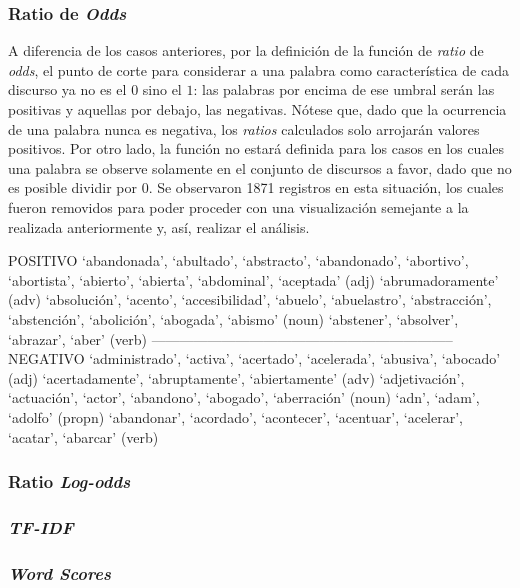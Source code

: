 \subsubsection{Ratio de \textit{Odds}}
A diferencia de los casos anteriores, por la definición de la función de
\textit{ratio} de \textit{odds}, el punto de corte para considerar
a una palabra como característica de cada discurso ya no es el $0$ sino el $1$:
las palabras por encima de ese umbral serán las positivas y aquellas por debajo,
las negativas. Nótese que, dado que la ocurrencia de una palabra nunca es negativa,
los \textit{ratios} calculados solo arrojarán valores positivos. Por otro lado,
la función no estará definida para los casos en los cuales una palabra se
observe solamente en el conjunto de discursos a favor, dado que no es posible
dividir por $0$. Se observaron 1871 registros en esta situación, los cuales
fueron removidos para poder proceder con una visualización semejante a la realizada
anteriormente y, así, realizar el análisis.
\par

POSITIVO
`abandonada', `abultado', `abstracto', `abandonado', `abortivo', `abortista', `abierto', `abierta', `abdominal', `aceptada' (adj)
`abrumadoramente' (adv)
`absolución', `acento', `accesibilidad', `abuelo', `abuelastro', `abstracción', `abstención', `abolición', `abogada', `abismo' (noun)
`abstener', `absolver', `abrazar', `aber' (verb)
-----------------------------------------------------------------
NEGATIVO
`administrado', `activa', `acertado', `acelerada', `abusiva', `abocado' (adj)
`acertadamente', `abruptamente', `abiertamente' (adv)
`adjetivación', `actuación', `actor', `abandono', `abogado', `aberración' (noun)
`adn', `adam', `adolfo' (propn)
`abandonar', `acordado', `acontecer', `acentuar', `acelerar', `acatar', `abarcar' (verb)


\subsubsection{Ratio \textit{Log-odds}}

\subsubsection{\textit{TF-IDF}}

\subsubsection{\textit{Word Scores}}


